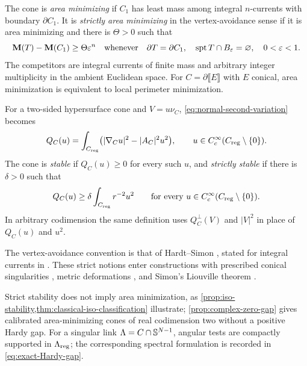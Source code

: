 \begin{definition}
\label{def:four-variational-notions}
The cone is \emph{area minimizing} if \(C_1\) has least mass among
integral \(n\)-currents with boundary \(\partial C_1\).  It is
\emph{strictly area minimizing} in the vertex-avoidance sense if it is
area minimizing and there is \(\Theta>0\) such that
\begin{equation}\label{eq:strict-minimality-definition}
 \mathbf M(T)-\mathbf M(C_1)\geq\Theta\varepsilon^n
 \quad\text{whenever}\quad
 \partial T=\partial C_1,\quad
 \operatorname{spt}T\cap B_\varepsilon=\varnothing,\quad 0<\varepsilon<1.
\end{equation}
The competitors are integral currents of finite mass and arbitrary
integer multiplicity in the ambient Euclidean space.
For \(C=\partial\llbracket E\rrbracket\) with \(E\)
conical, area minimization is equivalent to local perimeter minimization.

For a two-sided hypersurface cone and \(V=u\nu_C\),
\eqref{eq:normal-second-variation} becomes
\begin{equation}\label{eq:Q-definition}
 Q_C(u)=\int_{C_{\mathrm{reg}}}\bigl(|\nabla_Cu|^2-|A_C|^2u^2\bigr),
 \qquad u\in C_c^\infty(C_{\mathrm{reg}}\setminus\{0\}).
\end{equation}
The cone is \emph{stable} if \(Q_C(u)\geq0\) for every such \(u\), and
\emph{strictly stable} if there is \(\delta>0\) such that
\begin{equation}\label{eq:strict-stability-definition}
 Q_C(u)\geq\delta\int_{C_{\mathrm{reg}}}r^{-2}u^2
 \qquad\text{for every }u\in C_c^\infty(C_{\mathrm{reg}}\setminus\{0\}).
\end{equation}
In arbitrary codimension the same definition uses \(Q_C^\perp(V)\)
and \(|V|^2\) in place of \(Q_C(u)\) and \(u^2\).
\end{definition}

The vertex-avoidance convention is that of Hardt--Simon
\cite[Section~3, (3.1)]{HardtSimon85}, stated for integral currents in
\cite[p.~210]{Lin87}. These strict notions enter constructions with
prescribed conical singularities \cite{CaffarelliHardtSimon84},
metric deformations \cite{WangDeformations20}, and Simon's Liouville
theorem \cite[equations~(1.4), (1.12) and Corollary~1.13]{Simon21}.

Strict stability does not imply area minimization,
as \cref{prop:iso-stability,thm:classical-iso-classification} illustrate;
\cref{prop:complex-zero-gap} gives calibrated area-minimizing cones
of real codimension two without a positive Hardy gap.
For a singular link
\(\Lambda=C\cap\mathbb S^{N-1}\), angular tests are compactly supported in
\(\Lambda_{\mathrm{reg}}\); the corresponding spectral formulation is recorded
in \eqref{eq:exact-Hardy-gap}.

